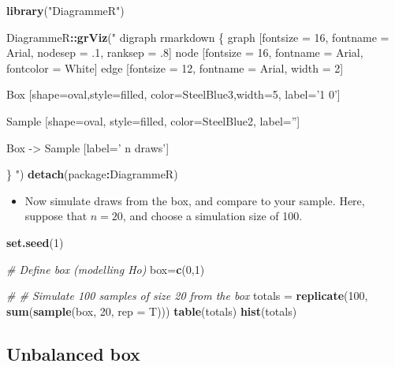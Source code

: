 \documentclass[]{article}
\newenvironment{Shaded}{\begin{snugshade}}{\end{snugshade}}
\newcommand{\CommentTok}[1]{\textcolor[rgb]{0.56,0.35,0.01}{\textit{#1}}}
\newcommand{\DataTypeTok}[1]{\textcolor[rgb]{0.13,0.29,0.53}{#1}}
\newcommand{\DecValTok}[1]{\textcolor[rgb]{0.00,0.00,0.81}{#1}}
\newcommand{\KeywordTok}[1]{\textcolor[rgb]{0.13,0.29,0.53}{\textbf{#1}}}
\newcommand{\NormalTok}[1]{#1}
\newcommand{\OperatorTok}[1]{\textcolor[rgb]{0.81,0.36,0.00}{\textbf{#1}}}
\newcommand{\StringTok}[1]{\textcolor[rgb]{0.31,0.60,0.02}{#1}}
\providecommand{\tightlist}{%
  \setlength{\itemsep}{0pt}\setlength{\parskip}{0pt}}
\begin{document}
\begin{Shaded}
\begin{Highlighting}[]
\KeywordTok{library}\NormalTok{(}\StringTok{"DiagrammeR"}\NormalTok{)}
  
\NormalTok{DiagrammeR}\OperatorTok{::}\KeywordTok{grViz}\NormalTok{(}\StringTok{" }
\StringTok{digraph rmarkdown \{}
\StringTok{  }
\StringTok{graph [fontsize = 16, fontname = Arial, nodesep = .1, ranksep = .8]}
\StringTok{node [fontsize = 16, fontname = Arial, fontcolor = White]}
\StringTok{edge [fontsize = 12, fontname = Arial, width = 2]}

\StringTok{Box [shape=oval,style=filled, color=SteelBlue3,width=5, label='1    0']}

\StringTok{Sample [shape=oval, style=filled, color=SteelBlue2, label='']}

\StringTok{Box -> Sample [label='   n draws']}

\StringTok{\}}
\StringTok{"}\NormalTok{)}
\KeywordTok{detach}\NormalTok{(package}\OperatorTok{:}\NormalTok{DiagrammeR)}
\end{Highlighting}
\end{Shaded}

\begin{itemize}
\tightlist
\item
  Now simulate draws from the box, and compare to your sample. Here, suppose that \(n=20\), and choose a simulation size of 100.
\end{itemize}

\begin{Shaded}
\begin{Highlighting}[]
\KeywordTok{set.seed}\NormalTok{(}\DecValTok{1}\NormalTok{)}

\CommentTok{# Define box (modelling Ho)}
\NormalTok{box=}\KeywordTok{c}\NormalTok{(}\DecValTok{0}\NormalTok{,}\DecValTok{1}\NormalTok{)}

\CommentTok{# # Simulate 100 samples of size 20 from the box}
\NormalTok{totals =}\StringTok{ }\KeywordTok{replicate}\NormalTok{(}\DecValTok{100}\NormalTok{, }\KeywordTok{sum}\NormalTok{(}\KeywordTok{sample}\NormalTok{(box, }\DecValTok{20}\NormalTok{, }\DataTypeTok{rep =}\NormalTok{ T)))}
\KeywordTok{table}\NormalTok{(totals)}
\KeywordTok{hist}\NormalTok{(totals)}
\end{Highlighting}
\end{Shaded}

\hypertarget{unbalanced-box}{%
\subsection{Unbalanced box}\label{unbalanced-box}}
\end{document}
